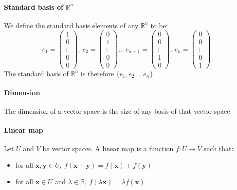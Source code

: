\documentclass{scrartcl}
\newcommand{\R}{\mathbb{R}}
\renewcommand{\vec}[1]{\mathbf{#1}}
\begin{document}
\paragraph{Standard basis of $ \R^{n} $}
We define the standard basis elements of any $ \R^{n} $ to be:
\begin{equation}
e_{1} = 
\begin{pmatrix}
1 \\ 0 \\ \vdots \\ 0 \\ 0
\end{pmatrix} , \ 
e_{2} = 
\begin{pmatrix}
0 \\ 1 \\ \vdots \\ 0 \\ 0
\end{pmatrix} ... \
e_{n-1} = 
\begin{pmatrix}
0 \\ 0 \\ \vdots \\ 1 \\ 0
\end{pmatrix} , \
e_{n} = 
\begin{pmatrix}
0 \\ 0 \\ \vdots \\ 0 \\ 1
\end{pmatrix}
\end{equation}
The standard basis of $ \R^{n} $ is therefore $ \{e_{1}, e_{2} \ ... \ e_{n} \} $.
\paragraph{Dimension}
The dimension of a vector space is the size of any basis of that vector space.
\paragraph{Linear map}
Let $ U $ and $ V $ be vector spaces. A linear map is a function $ f : U \to V $ such that:
\begin{itemize}
\item for all $ \vec{x}, \vec{y} \in U, \ f(\vec{x} + \vec{y}) = f(\vec{x}) + f(\vec{y}) $
\item for all $ \vec{x} \in U $ and $ \lambda \in \R, \ f(\lambda \vec{x}) = \lambda f(\vec{x}) $
\end{itemize}
\end{document}
